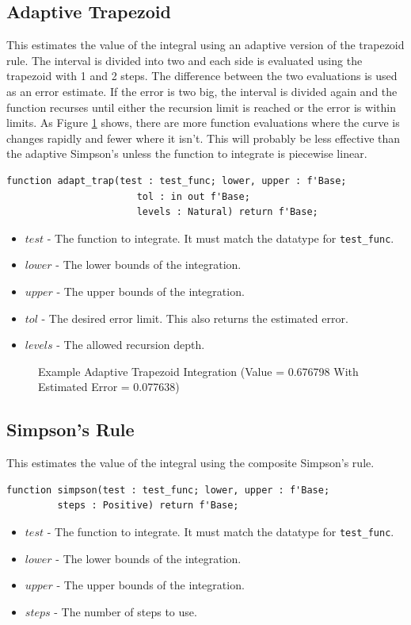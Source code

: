 \documentclass[10pt, openany]{book}
\newcommand{\indexfunc}[1]{\index[func]{#1}}
\newcommand{\datatype}[1]{\texttt{#1}}
\begin{document}
\subsection{Adaptive Trapezoid}
This estimates the value of the integral using an adaptive version of the trapezoid rule.  The interval is divided into two and each side is evaluated using the trapezoid with 1 and 2 steps.  The difference between the two evaluations is used as an error estimate.  If the error is two big, the interval is divided again and the function recurses until either the recursion limit is reached or the error is within limits.  As Figure \ref{tex:AdaptTrap} shows, there are more function evaluations where the curve is changes rapidly and fewer where it isn't.  This will probably be less effective than the adaptive Simpson's unless the function to integrate is piecewise linear.
\begin{lstlisting}
function adapt_trap(test : test_func; lower, upper : f'Base;
                       tol : in out f'Base;
                       levels : Natural) return f'Base;
\end{lstlisting}
\indexfunc{integ-adapt\_trap}
\begin{itemize}
  \item $test$ - The function to integrate.  It must match the datatype for \datatype{test\_func}.
  \item $lower$ - The lower bounds of the integration.
  \item $upper$ - The upper bounds of the integration.
  \item $tol$ - The desired error limit.  This also returns the estimated error.
  \item $levels$ - The allowed recursion depth.
\end{itemize}

\begin{figure}
  
  \caption{Example Adaptive Trapezoid Integration (Value = 0.676798 With Estimated Error = 0.077638)}
  \label{tex:AdaptTrap}
\end{figure}

\subsection{Simpson's Rule}
This estimates the value of the integral using the composite Simpson's rule.
\begin{lstlisting}
function simpson(test : test_func; lower, upper : f'Base;
         steps : Positive) return f'Base;
\end{lstlisting}
\indexfunc{integ-simpson}
\begin{itemize}
  \item $test$ - The function to integrate.  It must match the datatype for \datatype{test\_func}.
  \item $lower$ - The lower bounds of the integration.
  \item $upper$ - The upper bounds of the integration.
  \item $steps$ - The number of steps to use.
\end{itemize}
\end{document}
